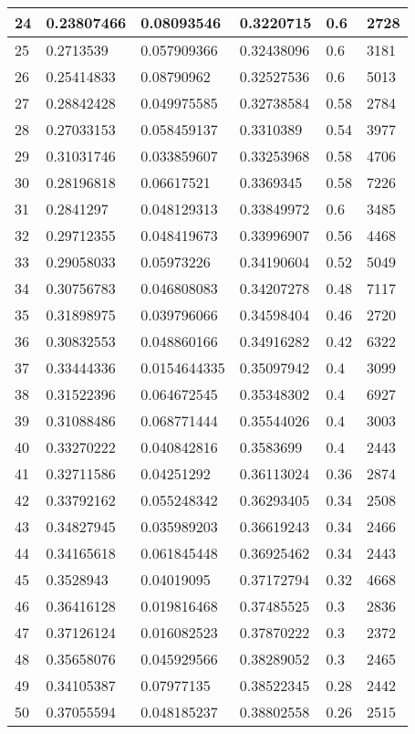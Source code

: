 \begin{longtable}{|l|l|l|l|l|l|}
24 & 0.23807466 & 0.08093546 & 0.3220715 & 0.6 & 2728 \\ \hline 
25 & 0.2713539 & 0.057909366 & 0.32438096 & 0.6 & 3181 \\ \hline 
26 & 0.25414833 & 0.08790962 & 0.32527536 & 0.6 & 5013 \\ \hline 
27 & 0.28842428 & 0.049975585 & 0.32738584 & 0.58 & 2784 \\ \hline 
28 & 0.27033153 & 0.058459137 & 0.3310389 & 0.54 & 3977 \\ \hline 
29 & 0.31031746 & 0.033859607 & 0.33253968 & 0.58 & 4706 \\ \hline 
30 & 0.28196818 & 0.06617521 & 0.3369345 & 0.58 & 7226 \\ \hline 
31 & 0.2841297 & 0.048129313 & 0.33849972 & 0.6 & 3485 \\ \hline 
32 & 0.29712355 & 0.048419673 & 0.33996907 & 0.56 & 4468 \\ \hline 
33 & 0.29058033 & 0.05973226 & 0.34190604 & 0.52 & 5049 \\ \hline 
34 & 0.30756783 & 0.046808083 & 0.34207278 & 0.48 & 7117 \\ \hline 
35 & 0.31898975 & 0.039796066 & 0.34598404 & 0.46 & 2720 \\ \hline 
36 & 0.30832553 & 0.048860166 & 0.34916282 & 0.42 & 6322 \\ \hline 
37 & 0.33444336 & 0.0154644335 & 0.35097942 & 0.4 & 3099 \\ \hline 
38 & 0.31522396 & 0.064672545 & 0.35348302 & 0.4 & 6927 \\ \hline 
39 & 0.31088486 & 0.068771444 & 0.35544026 & 0.4 & 3003 \\ \hline 
40 & 0.33270222 & 0.040842816 & 0.3583699 & 0.4 & 2443 \\ \hline 
41 & 0.32711586 & 0.04251292 & 0.36113024 & 0.36 & 2874 \\ \hline 
42 & 0.33792162 & 0.055248342 & 0.36293405 & 0.34 & 2508 \\ \hline 
43 & 0.34827945 & 0.035989203 & 0.36619243 & 0.34 & 2466 \\ \hline 
44 & 0.34165618 & 0.061845448 & 0.36925462 & 0.34 & 2443 \\ \hline 
45 & 0.3528943 & 0.04019095 & 0.37172794 & 0.32 & 4668 \\ \hline 
46 & 0.36416128 & 0.019816468 & 0.37485525 & 0.3 & 2836 \\ \hline 
47 & 0.37126124 & 0.016082523 & 0.37870222 & 0.3 & 2372 \\ \hline 
48 & 0.35658076 & 0.045929566 & 0.38289052 & 0.3 & 2465 \\ \hline 
49 & 0.34105387 & 0.07977135 & 0.38522345 & 0.28 & 2442 \\ \hline 
50 & 0.37055594 & 0.048185237 & 0.38802558 & 0.26 & 2515 \\ \hline 
\end{longtable}